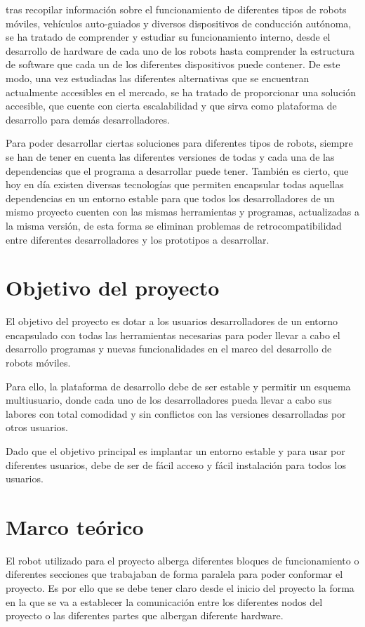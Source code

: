 tras recopilar información sobre el funcionamiento de diferentes tipos de robots móviles, vehículos auto-guiados y diversos dispositivos de conducción autónoma, se ha tratado de comprender y estudiar su funcionamiento interno, desde el desarrollo de hardware de cada uno de los robots hasta comprender la estructura de software que cada un de los diferentes dispositivos puede contener. De este modo, una vez estudiadas las diferentes alternativas que se encuentran actualmente accesibles en el mercado, se ha tratado de proporcionar una solución accesible, que cuente con cierta escalabilidad y que sirva como plataforma de desarrollo para demás desarrolladores. 

Para poder desarrollar ciertas soluciones para diferentes tipos de robots, siempre se han de tener en cuenta las diferentes versiones de todas y cada una de las dependencias que el programa a desarrollar puede tener. También es cierto, que hoy en día existen diversas tecnologías que permiten encapsular todas aquellas dependencias en un entorno estable para que todos los desarrolladores de un mismo proyecto cuenten con las mismas herramientas y programas, actualizadas a la misma versión, de esta forma se eliminan problemas de retrocompatibilidad entre diferentes desarrolladores y los prototipos a desarrollar.

\section{Objetivo del proyecto} 

El objetivo del proyecto es dotar a los usuarios desarrolladores de un entorno encapsulado con todas las herramientas necesarias para poder llevar a cabo el desarrollo programas y nuevas funcionalidades en el marco del desarrollo de robots móviles.

Para ello, la plataforma de desarrollo debe de ser estable y permitir un esquema multiusuario, donde cada uno de los desarrolladores pueda llevar a cabo sus labores con total comodidad y sin conflictos con las versiones desarrolladas por otros usuarios.

Dado que el objetivo principal es implantar un entorno estable y para usar por diferentes usuarios, debe de ser de fácil acceso y fácil instalación para todos los usuarios.
 \section{Marco teórico}
 
El robot utilizado para el proyecto alberga diferentes bloques de funcionamiento o diferentes secciones que trabajaban de forma paralela para poder conformar el proyecto. Es por ello que se debe tener claro desde el inicio del proyecto la forma en la que se va a establecer la comunicación entre los diferentes nodos del proyecto o las diferentes partes que albergan diferente hardware.

